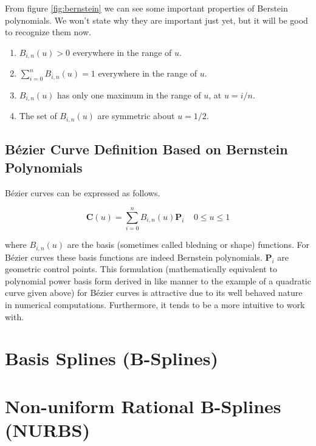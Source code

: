 From figure \ref{fig:bernstein} we can see some important properties of Berstein polynomials. We won't state why they are important just yet, but it will be good to recognize them now.

\begin{enumerate}
	\item $B_{i,n}(u) > 0$ everywhere in the range of $u$.
	\item $\sum_{i=0}^n B_{i,n}(u) = 1$ everywhere in the range of $u$.
	\item $B_{i,n}(u)$ has only one maximum in the range of $u$, at $u=i/n$.
	\item The set of  $B_{i,n}(u)$ are symmetric about $u=1/2$.
\end{enumerate}

\subsection{Bézier Curve Definition Based on Bernstein Polynomials}

Bézier curves can be expressed as follows.

$$ \textbf{C}(u) = \sum^n_{i=0}B_{i,n}(u) \textbf{P}_i~~~~~0\leq u \leq1 $$

where $B_{i,n}(u)$ are the basis (sometimes called bledning or shape) functions. For Bézier curves these basis functions are indeed Bernstein polynomials. \(\textbf{P}_i\) are geometric control points.  This formulation (mathematically equivalent to polynomial power basis form derived in like manner to the example of a quadratic curve given above) for Bézier curves is attractive due to its well behaved nature in numerical computations. Furthermore, it tends to be a more intuitive to work with. 

\section{Basis Splines (B-Splines)}

\section{Non-uniform Rational B-Splines (NURBS)}



%
%  

 
